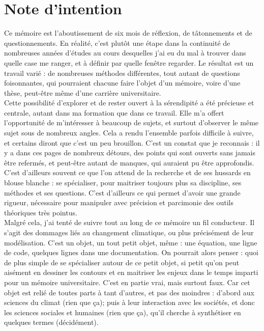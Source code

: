 \chapter*{Note d'intention}

Ce mémoire est l'aboutissement de six mois de réflexion, de tâtonnements et de questionnements. En réalité, c'est plutôt une étape dans la continuité de nombreuses années d'études au cours desquelles j'ai eu du mal à trouver dans quelle case me ranger, et à définir par quelle fenêtre regarder. Le résultat est un travail varié : de nombreuses méthodes différentes, tout autant de questions foisonnantes, qui pourraient chacune faire l'objet d'un mémoire, voire d'une thèse, peut-être même d'une carrière universitaire. \\

Cette possibilité d'explorer et de rester ouvert à la sérendipité a été précieuse et centrale, autant dans ma formation que dans ce travail. Elle m'a offert l'opportunité de m'intéresser à beaucoup de sujets, et surtout d’observer le même sujet sous de nombreux angles. Cela a rendu l'ensemble parfois difficile à suivre, et certains diront que c'est un peu brouillon. C'est un constat que je reconnais : il y a dans ces pages de nombreux détours, des points qui sont ouverts sans jamais être refermés, et peut-être autant de manques, qui auraient pu être approfondis. C'est d'ailleurs souvent ce que l'on attend de la recherche et de ses hussards en blouse blanche : se spécialiser, pour maitriser toujours plus sa discipline, ses méthodes et ses questions. C'est d'ailleurs ce qui permet d'avoir une grande rigueur, nécessaire pour manipuler avec précision et parcimonie des outils théoriques très pointus. \\

Malgré cela, j'ai tenté de suivre tout au long de ce mémoire un fil conducteur. Il s'agit des dommages liés au changement climatique, ou plus précisément de leur modélisation. C'est un objet, un tout petit objet, même : une équation, une ligne de code, quelques lignes dans une documentation. On pourrait alors penser : quoi de plus simple de se spécialiser autour de ce petit objet, si petit qu'on peut aisément en dessiner les contours et en maitriser les enjeux dans le temps imparti pour un mémoire universitaire. C'est en partie vrai, mais surtout faux. Car cet objet est relié de toutes parts à tant d'autres, et pas des moindres : d'abord aux sciences du climat (rien que ça); puis à leur interaction avec les sociétés, et donc les sciences sociales et humaines (rien que ça), qu'il cherche à synthétiser en quelques termes (décidément). \\

